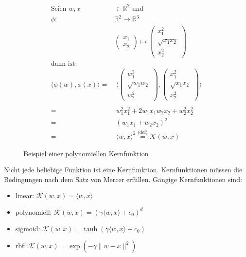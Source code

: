 \renewcommand{\figurename}{Bsp.}
\begin{figure}[htbp]
\begin{equation*}
\label{eq:svm_kernel_example}
\begin{split}
    \text{Seien } w,x & \in \mathbb{R}^2 \text{ und}\\
    \phi : & \mathbb{R}^2 \to \mathbb{R}^3\\
    & \begin{pmatrix}
    x_1 \\
    x_2
    \end{pmatrix}
    \mapsto
    \begin{pmatrix}
    x_1^2 \\
    \sqrt{x_1x_2} \\
    x_2^2
    \end{pmatrix}\\
    \text{dann ist:} &\\
    \langle \phi(w),\phi(x) \rangle = & \:\langle \begin{pmatrix}
    w_1^2 \\
    \sqrt{w_1w_2} \\
    w_2^2
    \end{pmatrix},
    \begin{pmatrix}
    x_1^2 \\
    \sqrt{x_1x_2} \\
    x_2^2
    \end{pmatrix} \rangle \\
    \\
    = & \:w_1^2x_1^2 + 2 w_1x_1w_2x_2 + w_2^2x_2^2 \\
    = & \:(w_1x_1 + w_2x_2)^2 \\
    = & \:\langle w,x \rangle^2 \overset{\text{(def)}}= \mathcal{K}(w,x)
\end{split}
\end{equation*}
    \caption{Beispiel einer polynomiellen Kernfunktion}
    \label{fig:ex_kernel}
\end{figure}
Nicht jede beliebige Funktion ist eine Kernfunktion. Kernfunktionen müssen die Bedingungen nach dem Satz von Mercer \cite[S. 127]{Marsland} erfüllen. 
Gängige Kernfunktionen sind:
\begin{itemize}
\item{linear: $\mathcal{K}(w,x) = \langle w,x \rangle$}
\item{polynomiell: $\mathcal{K}(w,x) = (\gamma\langle w,x \rangle+c_0)^d$}
\item{sigmoid: $\mathcal{K}(w,x) = \tanh(\gamma\langle w,x \rangle+c_0)$}
\item{rbf: $\mathcal{K}(w,x) = \exp(- \gamma \|w - x \| ^2)$}
\end{itemize}

